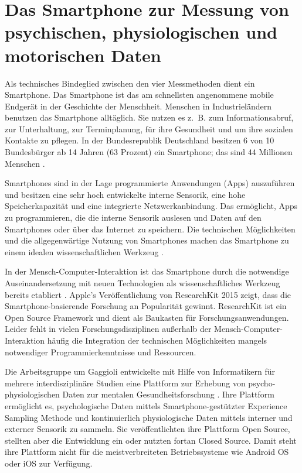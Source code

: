 

\section{Das Smartphone zur Messung von psychischen, physiologischen und motorischen Daten} 

\label{sec:das_smartphone_zur_messung_von_psychischen_physiologischen_und_motorischen_daten}

Als technisches Bindeglied zwischen den vier Messmethoden dient ein Smartphone. Das Smartphone ist das am schnellsten angenommene mobile Endgerät in der Geschichte der Menschheit. Menschen in Industrieländern benutzen das Smartphone alltäglich. Sie nutzen es z.~B. zum Informationsabruf, zur Unterhaltung, zur Terminplanung, für ihre Gesundheit und um ihre sozialen Kontakte zu pflegen. In der Bundesrepublik Deutschland besitzen 6 von 10 Bundesbürger ab 14 Jahren (63 Prozent) ein Smartphone; das sind 44 Millionen Menschen \citep{bitkom2015}.

Smartphones sind in der Lage programmierte Anwendungen (Apps) auszuführen und besitzen eine sehr hoch entwickelte interne Sensorik, eine hohe Speicherkapazität und eine integrierte Netzwerkanbindung. Das ermöglicht, Apps zu programmieren, die die interne Sensorik auslesen und Daten auf den Smartphones oder über das Internet zu speichern. Die technischen Möglichkeiten und die allgegenwärtige Nutzung von Smartphones machen das Smartphone zu einem idealen wissenschaftlichen Werkzeug \citep{Raento2009}.

In der Mensch-Computer-Interaktion ist das Smartphone durch die notwendige Auseinandersetzung mit neuen Technologien als wissenschaftliches Werkzeug bereits etabliert \citep{Froehlich2007}. Apple's Veröffentlichung von ResearchKit 2015 zeigt, dass die Smartphone-basierende Forschung an Popularität gewinnt. ResearchKit ist ein Open Source Framework und dient als Baukasten für Forschungsanwendungen. Leider fehlt in vielen Forschungsdisziplinen außerhalb der Mensch-Computer-Interaktion häufig die Integration der technischen Möglichkeiten mangels notwendiger Programmierkenntnisse und Ressourcen.

Die Arbeitsgruppe um Gaggioli entwickelte mit Hilfe von Informatikern für mehrere interdisziplinäre Studien eine Plattform zur Erhebung von psycho-physiologischen Daten zur mentalen Gesundheitsforschung \citep{Gaggioli2013}. Ihre Plattform ermöglicht es, psychologische Daten mittels Smartphone-gestützter Experience Sampling Methode und kontinuierlich physiologische Daten mittels interner und externer Sensorik zu sammeln. Sie veröffentlichten ihre Plattform Open Source, stellten aber die Entwicklung ein oder nutzten fortan Closed Source. Damit steht ihre Plattform nicht für die meistverbreiteten Betriebssysteme wie Android OS oder iOS zur Verfügung.

